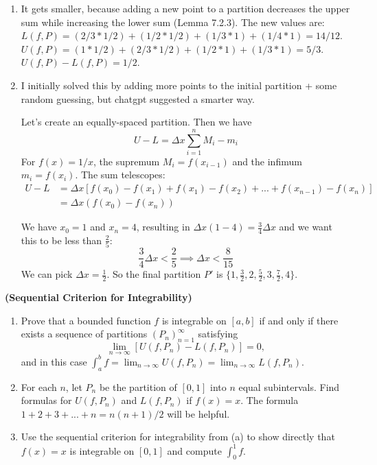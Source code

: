 \documentclass{oxmathproblems}
\begin{document}
\begin{questions}
\begin{solution}
\begin{enumerate}[label=(\alph*)]
    \item It gets smaller, because adding a new point to a partition decreases the upper sum while increasing the lower sum (Lemma 7.2.3). The new values are:\\
    $L(f, P) = (2/3 * 1/2) + (1/2 * 1/2) + (1/3 * 1) + (1/4 * 1) = 14/12$.\\
    $U(f, P) = (1 * 1/2)+ (2/3 * 1/2) + (1/2 * 1) + (1/3 * 1) = 5/3$.\\
    $U(f, P)-L(f, P)= 1/2$.

    \item I initially solved this by adding more points to the initial partition + some random guessing, but chatgpt suggested a smarter way.
    
    Let's create an equally-spaced partition. Then we have
    \[U - L = \Delta{x}\sum_{i=1}^{n}M_{i}-m_{i}\]
    For $f(x)=1/x$, the supremum $M_{i}=f(x_{i-1})$ and the infimum $m_{i}=f(x_{i})$. The sum telescopes:
    \begin{align*}
     U-L &= \Delta{x} [f(x_{0})-f(x_{1}) + f(x_{1})-f(x_{2}) + ... + f(x_{n-1})-f(x_{n})]\\
     &=\Delta{x} (f(x_{0})-f(x_{n}))
    \end{align*}

    We have $x_{0}=1$ and $x_{n}=4$, resulting in $\Delta{x}(1-4) = \frac{3}{4}\Delta{x}$ and we want this to be less than $\frac{2}{5}$:
    \[\frac{3}{4}\Delta{x} < \frac{2}{5} \implies \Delta{x} < \frac{8}{15}\]
    We can pick $\Delta{x}=\frac{1}{2}$. So the final partition $P'$ is $\{1, \frac{3}{2}, 2, \frac{5}{2}, 3, \frac{7}{2}, 4\}$.
  \end{enumerate}
\end{solution}

\miquestion \textbf{(Sequential Criterion for Integrability)}
\begin{enumerate}[label=(\alph*)]
  \item Prove that a bounded function $f$ is integrable on $[a, b]$ if and only if there exists a sequence of partitions $(P_{n})_{n=1}^{\infty}$ satisfying
  \[\lim_{n \to \infty} [U(f, P_{n}) - L(f, P_{n})] = 0,\]
  and in this case $\int_{a}^{b}f = \lim_{n \to \infty} U(f, P_{n}) = \lim_{n \to \infty}L(f, P_{n})$.
  \item For each $n$, let $P_{n}$ be the partition of $[0, 1]$ into $n$ equal subintervals. Find formulas for $U(f, P_{n})$ and $L(f, P_{n})$ if $f(x)=x$. The formula
  $1+2+3+...+n=n(n+1)/2$ will be helpful.
  \item Use the sequential criterion for integrability from (a) to show directly that $f(x)=x$ is integrable on $[0, 1]$ and compute $\int_{0}^{1}f$.
\end{enumerate}


\end{questions}
\end{document}
